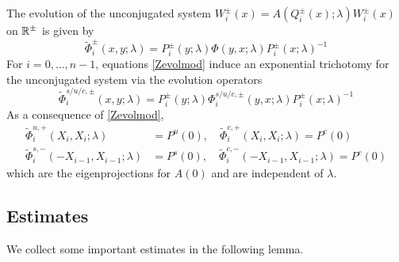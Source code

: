 \documentclass[10pt,reqno]{amsart}
\theoremstyle{plain}
\theoremstyle{definition}
\theoremstyle{remark}
\numberwithin{theorem}{section}
\numberwithin{equation}{section}
\begin{document}
The evolution of the unconjugated system $W_i^\pm(x) = A(Q_i^\pm(x); \lambda) W_i^\pm(x)$ on $\mathbb{R}^\pm$ is given by
\begin{equation}\label{unconjevol2}
\tilde{\Phi}_i^\pm(x, y; \lambda) = P_i^\pm(y; \lambda) \Phi(y, x; \lambda) P_i^\pm(x; \lambda)^{-1}
\end{equation}
For $i = 0, \dots, n-1$, equations \cref{Zevolmod} induce an exponential trichotomy for the unconjugated system via the evolution operators
\begin{equation}\label{trichunconj}
\tilde{\Phi}_i^{s/u/c,\pm}(x, y; \lambda) = P_i^\pm(y; \lambda) \Phi_i^{s/u/c,\pm}(y, x; \lambda) P_i^\pm(x; \lambda)^{-1}
\end{equation}
As a consequence of \cref{Zevolmod},
\begin{align*}
\tilde{\Phi}_i^{u,+}(X_i, X_i ; \lambda) &= P^u(0), \quad
\tilde{\Phi}_i^{c,+}(X_i, X_i ; \lambda) = P^c(0) \\
\tilde{\Phi}_i^{s,-}(-X_{i-1}, X_{i-1} ; \lambda) &= P^s(0), \quad
\tilde{\Phi}_i^{c,-}(-X_{i-1}, X_{i-1} ; \lambda) = P^c(0)
\end{align*}
which are the eigenprojections for $A(0)$ and are independent of $\lambda$.

\subsection{Estimates}

We collect some important estimates in the following lemma.
\end{document}
